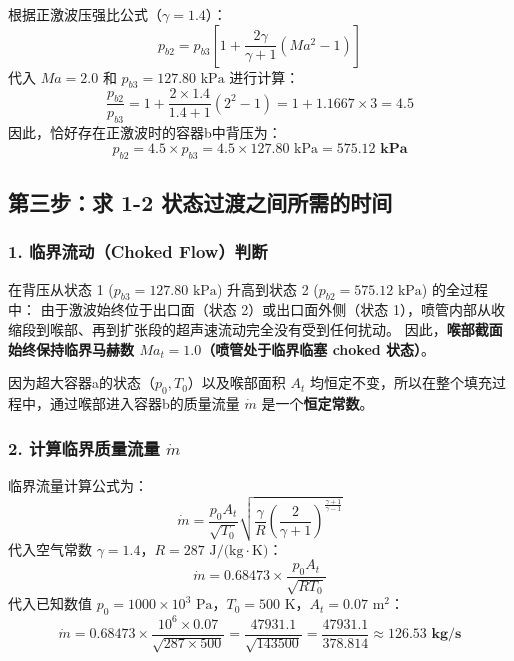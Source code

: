 \documentclass[11pt,a4paper]{article}
\begin{document}
根据正激波压强比公式（$\gamma = 1.4$）：
\begin{equation}
    p_{b2} = p_{b3} \left[ 1 + \frac{2\gamma}{\gamma + 1} \left( Ma^2 - 1 \right) \right]
\end{equation}
代入 $Ma = 2.0$ 和 $p_{b3} = 127.80\text{ kPa}$ 进行计算：
\begin{equation}
    \frac{p_{b2}}{p_{b3}} = 1 + \frac{2 \times 1.4}{1.4 + 1} \left( 2^2 - 1 \right) = 1 + 1.1667 \times 3 = 4.5
\end{equation}
因此，恰好存在正激波时的容器b中背压为：
\begin{equation}
    p_{b2} = 4.5 \times p_{b3} = 4.5 \times 127.80\text{ kPa} = \mathbf{575.12\text{ kPa}}
\end{equation}

\newpage

\subsection{第三步：求 1-2 状态过渡之间所需的时间}

\subsubsection{1. 临界流动（Choked Flow）判断}
在背压从状态 1 ($p_{b3} = 127.80\text{ kPa}$) 升高到状态 2 ($p_{b2} = 575.12\text{ kPa}$) 的全过程中：
由于激波始终位于出口面（状态 2）或出口面外侧（状态 1），喷管内部从收缩段到喉部、再到扩张段的超声速流动完全没有受到任何扰动。
因此，\textbf{喉部截面始终保持临界马赫数 $Ma_t = 1.0$（喷管处于临界临塞 choked 状态）}。

因为超大容器a的状态（$p_0, T_0$）以及喉部面积 $A_t$ 均恒定不变，所以在整个填充过程中，通过喉部进入容器b的质量流量 $\dot{m}$ 是一个\textbf{恒定常数}。

\subsubsection{2. 计算临界质量流量 $\dot{m}$}
临界流量计算公式为：
\begin{equation}
    \dot{m} = \frac{p_0 A_t}{\sqrt{T_0}} \sqrt{\frac{\gamma}{R} \left( \frac{2}{\gamma + 1} \right)^{\frac{\gamma + 1}{\gamma - 1}}}
\end{equation}
代入空气常数 $\gamma = 1.4$，$R = 287\text{ J/(kg}\cdot\text{K)}$：
\begin{equation}
    \dot{m} = 0.68473 \times \frac{p_0 A_t}{\sqrt{R T_0}}
\end{equation}
代入已知数值 $p_0 = 1000 \times 10^3\text{ Pa}$，$T_0 = 500\text{ K}$，$A_t = 0.07\text{ m}^2$：
\begin{equation}
    \dot{m} = 0.68473 \times \frac{10^6 \times 0.07}{\sqrt{287 \times 500}} = \frac{47931.1}{\sqrt{143500}} = \frac{47931.1}{378.814} \approx \mathbf{126.53\text{ kg/s}}
\end{equation}
\end{document}
